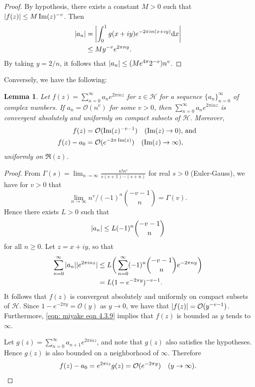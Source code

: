 \documentclass[10pt,leqno,twoside]{article}
\theoremstyle{plain}
\newtheorem{lemma}[lem]{Lemma}
\theoremstyle{definition}
\numberwithin{equation}{section}
\numberwithin{lem}{section}
\begin{document}
\begin{proof}
    By hypothesis, there exists a constant $M>0$ such that $\abs{f(z)}\leq M\Im(z)^{-v}$. Then \begin{align*}
        \abs{a_n} &= \abs{\int_0^1 g(x+iy)e^{-2\pi i n (x+iy)}\dd x}\\
        &\leq My^{-v}e^{2\pi n y}.
    \end{align*} By taking $y = 2/n$, it follows that $\abs{a_n} \leq (Me^{4\pi}2^{-v})n^v$.
\end{proof} Conversely, we have the following:
\begin{lemma}\label{lem: miyake lem 4.3.3}
    Let $f(z) = \sum_{n=0}^\infty a_ne^{2\pi i nz}$ for $z\in \mathcal H$ for a sequence $\{a_n\}_{n=0}^\infty$ of complex numbers. If $a_n = \mathcal O(n^v)$ for some $v >0$, then $\sum_{n=0}^\infty a_ne^{2\pi i nz}$ is convergent absolutely and uniformly on compact subsets of $\mathcal H$. Moreover, 
    \begin{align*}
        f(z) &= \mathcal O(\Im(z)^{-v-1}) \quad\textup{($\Im(z) \to 0$), and }\\
        f(z) - a_0 &= \mathcal O(e^{-2\pi \Im(z)}) \quad\textup{($\Im(z) \to \infty$)},
    \end{align*}
    uniformly on $\Re(z)$.
\end{lemma}
\begin{proof}
    From $\varGamma(s) = \lim_{n\to \infty}\frac{n!n^s}{s(s+1)\cdots(s+n)}$ for real $s>0$ (Euler-Gauss), we have for $v>0$ that
    \[\lim_{n\to\infty} n^v/(-1)^n\binom{-v-1}{n} = \varGamma(v).\]
    Hence there exists $L>0$ such that 
    \[\abs{a_n}\leq L(-1)^n\binom{-v-1}{n}\] for all $n\geq 0$. Let $z = x+iy$, so that 
    \begin{align}\label{eqn: miyake eqn 4.3.9}
        \sum_{n=0}^\infty\abs{a_n}|e^{2\pi i n z}|&\leq L\bigg(\sum_{n=0}^\infty (-1)^n\binom{-v-1}{n}e^{-2\pi n y}\bigg)\\
        &= L(1-e^{-2\pi y})^{-v-1}.\nonumber
    \end{align}
    It follows that $f(z)$ is convergent absolutely and uniformly on compact subsets of $\mathcal H$. Since $1-e^{-2\pi y} = \mathcal O(y)$ as $y\to 0$, we have that $\abs{f(z)} = \mathcal O(y^{-v-1})$. Furthermore, \cref{eqn: miyake eqn 4.3.9} implies that $f(z)$ is bounded as $y$ tends to $\infty$.

    Let $g(z) = \sum_{n=0}^\infty a_{n+1}e^{2\pi i nz}$, and note that $g(z)$ also satisfies the hypotheses. Hence $g(z)$ is also bounded on a neighborhood of $\infty$. Therefore 
    \[f(z)-a_0 = e^{2\pi i z}g(z) = \mathcal O(e^{-2\pi y})\quad (y\to \infty).\qedhere\]
\end{proof}
\end{document}
